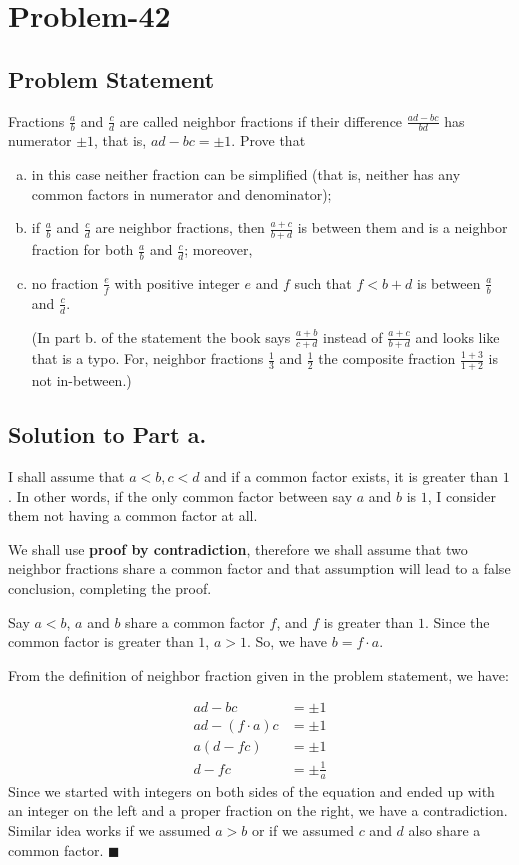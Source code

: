 \documentclass{article}
\begin{document}
\section*{Problem-42}

\subsection*{Problem Statement}
Fractions $\frac{a}{b}$ and $\frac{c}{d}$ are called neighbor fractions if their difference $\frac{ad-bc}{bd}$ has numerator $\pm 1$, that is, $ad-bc = \pm 1$. Prove that 
\begin{enumerate}[a.]
\item in this case neither fraction can be simplified (that is, neither has any common factors in numerator and denominator);
\item if $\frac{a}{b}$ and $\frac{c}{d}$ are neighbor fractions, then $\frac{a+c}{b+d}$ is between them and is a neighbor fraction for both $\frac{a}{b}$ and $\frac{c}{d}$; moreover,
\item no fraction $\frac{e}{f}$ with positive integer $e$ and $f$ such that $f < b+d$ is between $\frac{a}{b}$ and $\frac{c}{d}$.

(In part b. of the statement the book says $\frac{a+b}{c+d}$ instead of $\frac{a+c}{b+d}$ and looks like that is a typo. For, neighbor fractions $\frac{1}{3}$ and $\frac{1}{2}$ the composite fraction $\frac{1+3}{1+2}$ is not in-between.)
\end{enumerate}
\subsection*{Solution to Part a.}
I shall assume that $a < b, c < d$ and if a common factor exists, it is greater than $1$. In other words, if the only common factor between say $a$ and $b$ is $1$, I consider them not having a common factor at all.

We shall use \textbf{proof by contradiction}, therefore we shall assume that two neighbor fractions share a common factor and that assumption will lead to a false conclusion, completing the proof. 

Say $a < b$, $a$ and $b$ share a common factor $f$, and $f$ is greater than $1$. Since the common factor is greater than $1$, $a > 1$. So, we have $b = f\cdot a$.

From the definition of neighbor fraction given in the problem statement, we have:

\begin{displaymath}
\begin{split}
	ad - bc         & = \pm 1\\
	ad-(f \cdot a)c & = \pm 1\\
	a(d-fc)         & = \pm 1\\
	d-fc            & = \pm \frac{1}{a}
\end{split}
\end{displaymath}
Since we started with integers on both sides of the equation and ended up with an integer on the left and a proper fraction on the right, we have a contradiction. Similar idea works if we assumed $a > b$ or if we assumed $c$ and $d$ also share a common factor. $\blacksquare$
\end{document}
